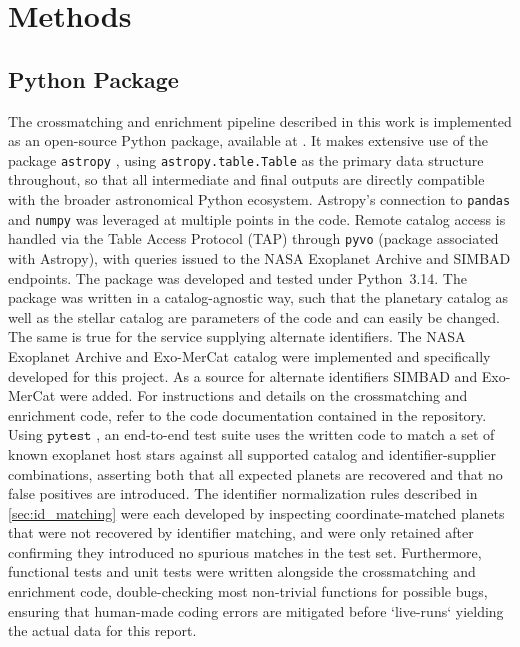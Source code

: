 \newpage
\section{Methods}
\subsection{Python Package}
The crossmatching and enrichment pipeline described in this work is implemented as an open-source Python package, available at . It makes extensive use of the package \texttt{astropy} \cite{astropy:2013, astropy:2018, astropy:2022}, using \texttt{astropy.table.Table} as the primary data structure throughout, so  that all intermediate and final outputs are directly compatible with the broader astronomical Python ecosystem. Astropy's connection to \texttt{pandas} \cite{pandas} and \texttt{numpy} \cite{numpy} was leveraged at multiple points in the code. Remote catalog access is handled via the Table Access Protocol (TAP) through \texttt{pyvo} (package associated with Astropy), with queries issued to the NASA Exoplanet Archive and SIMBAD endpoints. The package was developed and tested under Python~3.14.                      
The package was written in a catalog-agnostic way, such that the planetary catalog as well as the stellar catalog are parameters of the code and can easily be changed. The same is true for the service supplying alternate identifiers. The NASA Exoplanet Archive and Exo-MerCat catalog were implemented and specifically developed for this project. As a source for alternate identifiers SIMBAD and Exo-MerCat were added. For instructions and details on the crossmatching and enrichment code, refer to the code documentation contained in the repository.
Using $\texttt{pytest}$ \cite{pytest}, an end-to-end test suite uses the written code to match a set of known exoplanet host stars against all supported catalog and identifier-supplier combinations, asserting both that all expected planets are recovered and that no false positives are introduced. The identifier  normalization rules described in \cref{sec:id_matching} were each developed by inspecting coordinate-matched planets that were not recovered by  identifier matching, and were only retained after confirming they introduced no spurious matches in the test set.
Furthermore, functional tests and unit tests were written alongside the crossmatching and enrichment code, double-checking most non-trivial functions for possible bugs, ensuring that human-made coding errors are mitigated before `live-runs` yielding the actual data for this report.
